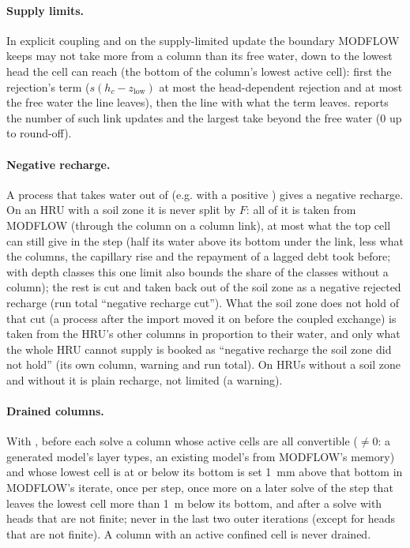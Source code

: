 \paragraph{Supply limits.} In explicit coupling and on the supply-limited update the boundary MODFLOW keeps may not take more
from a column than its free water, down to the lowest head the cell can reach (the bottom of the column's lowest active
cell): first the rejection's term ($s(h_c-z_{\mathrm{low}})$ at most the head-dependent rejection and at most the free water
the line leaves), then the line with what the term leaves.  reports the number of such link updates
and the largest take beyond the free water (0 up to round-off).

\paragraph{Negative recharge.}\label{sec:negrecharge} A process that takes water out of  (e.g.  with a positive ) gives a negative recharge. On an HRU with a soil zone it is never split by $F$: all
of it is taken from MODFLOW (through the column on a column link), at most what the top cell can still give in the step
(half its water above its bottom under the link, less what the columns, the capillary rise and the repayment of a lagged
debt took before; with depth classes this one limit also bounds the share of the classes without a column); the rest is cut and taken back out of the soil zone as a negative rejected recharge (run total ``negative
recharge cut''). What the soil zone does not hold of that cut (a process after the import moved it on before the coupled
exchange) is taken from the HRU's other columns in proportion to their water, and only what the whole HRU cannot supply is
booked as ``negative recharge the soil zone did not hold'' (its own  column, warning and run total). On HRUs
without a soil zone and without  it is plain recharge, not limited (a warning).

\paragraph{Drained columns.}\label{sec:drained} With , before each solve a column whose active cells are all convertible
($\neq0$: a generated model's layer types, an existing model's from MODFLOW's memory) and whose lowest cell is
at or below its bottom is set 1~mm above that bottom in MODFLOW's iterate, once per step, once more on a later solve of the
step that leaves the lowest cell more than 1~m below its bottom, and after a solve with heads that are not finite; never in
the last two outer iterations (except for heads that are not finite). A column with an active confined cell is never drained.

